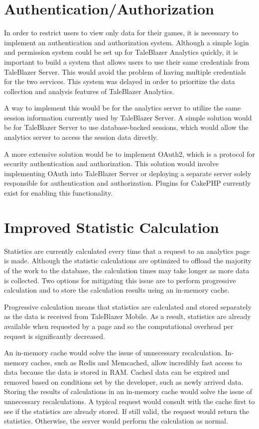 \section{Authentication/Authorization}

In order to restrict users to view only data for their games, it is necessary to implement an authentication and authorization system. Although a simple login and permission system could be set up for TaleBlazer Analytics quickly, it is important to build a system that allows users to use their same credentials from TaleBlazer Server. This would avoid the problem of having multiple credentials for the two services. This system was delayed in order to prioritize the data collection and analysis features of TaleBlazer Analytics.

A way to implement this would be for the analytics server to utilize the same session information currently used by TaleBlazer Server. A simple solution would be for TaleBlazer Server to use database-backed sessions, which would allow the analytics server to access the session data directly.

A more extensive solution would be to implement OAuth2, which is a protocol for security authentication and authorization. This solution would involve implementing OAuth into TaleBlazer Server or deploying a separate server solely responsible for authentication and authorization. Plugins for CakePHP currently exist for enabling this functionality. 

\section{Improved Statistic Calculation}

Statistics are currently calculated every time that a request to an analytics page is made. Although the statistic calculations are optimized to offload the majority of the work to the database, the calculation times may take longer as more data is collected. Two options for mitigating this issue are to perform progressive calculation and to store the calculation results using an in-memory cache. 

Progressive calculation means that statistics are calculated and stored separately as the data is received from TaleBlazer Mobile. As a result, statistics are already available when requested by a page and so the computational overhead per request is significantly decreased. 

An in-memory cache would solve the issue of unnecessary recalculation. In-memory caches, such as Redis and Memcached, allow incredibly fast access to data because the data is stored in RAM. Cached data can be expired and removed based on conditions set by the developer, such as newly arrived data. Storing the results of calculations in an in-memory cache would solve the issue of unnecessary recalculations. A typical request would consult with the cache first to see if the statistics are already stored. If still valid, the request would return the statistics. Otherwise, the server would perform the calculation as normal.

